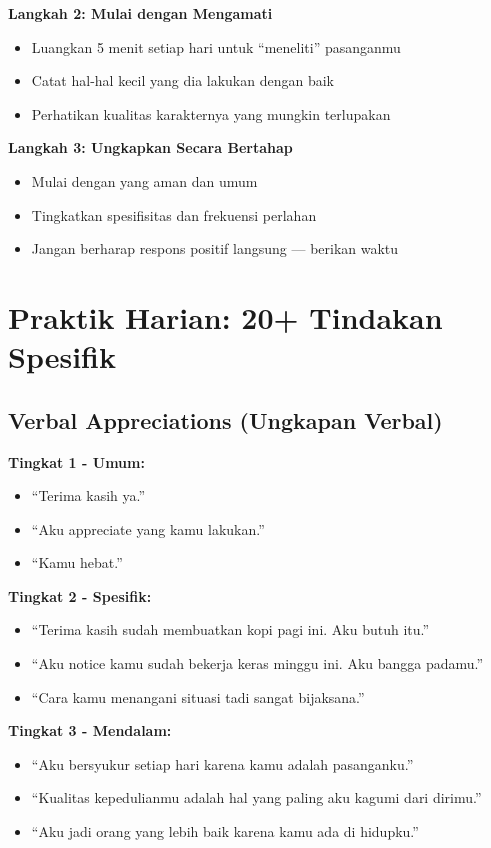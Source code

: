 \textbf{Langkah 2: Mulai dengan Mengamati}
\begin{itemize}
    \item Luangkan 5 menit setiap hari untuk ``meneliti'' pasanganmu
    \item Catat hal-hal kecil yang dia lakukan dengan baik
    \item Perhatikan kualitas karakternya yang mungkin terlupakan
\end{itemize}

\textbf{Langkah 3: Ungkapkan Secara Bertahap}
\begin{itemize}
    \item Mulai dengan yang aman dan umum
    \item Tingkatkan spesifisitas dan frekuensi perlahan
    \item Jangan berharap respons positif langsung --- berikan waktu
\end{itemize}

\section{Praktik Harian: 20+ Tindakan Spesifik}

\subsection{Verbal Appreciations (Ungkapan Verbal)}

\begin{praktikbox}
\textbf{Tingkat 1 - Umum:}
\begin{itemize}
    \item ``Terima kasih ya.''
    \item ``Aku appreciate yang kamu lakukan.''
    \item ``Kamu hebat.''
\end{itemize}

\textbf{Tingkat 2 - Spesifik:}
\begin{itemize}
    \item ``Terima kasih sudah membuatkan kopi pagi ini. Aku butuh itu.''
    \item ``Aku notice kamu sudah bekerja keras minggu ini. Aku bangga padamu.''
    \item ``Cara kamu menangani situasi tadi sangat bijaksana.''
\end{itemize}

\textbf{Tingkat 3 - Mendalam:}
\begin{itemize}
    \item ``Aku bersyukur setiap hari karena kamu adalah pasanganku.''
    \item ``Kualitas kepedulianmu adalah hal yang paling aku kagumi dari dirimu.''
    \item ``Aku jadi orang yang lebih baik karena kamu ada di hidupku.''
\end{itemize}
\end{praktikbox}

